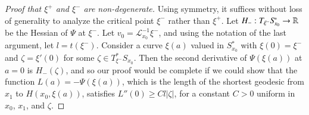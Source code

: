 


\begin{proof}[Proof that $\xi^+$ and $\xi^-$ are non-degenerate]
    Using symmetry, it suffices without loss of generality to analyze the critical point $\xi^-$ rather than $\xi^+$. Let $H_-: T_{\xi^-} S\!_{x_0}^* \to \operatorname{\mathbb{R}}$ be the Hessian of $\Psi$ at $\xi^-$. Let $v_0 = \mathcal{L}_{x_0}^{-1} \xi^-$, and using the notation of the last argument, let $l = t(\xi^-)$. Consider a curve $\xi(a)$ valued in $S\!_{x_0}^*$ with $\xi(0) = \xi^-$ and $\zeta = \xi'(0)$ for some $\zeta \in T_{\xi^-}^* S\!_{x_0}$. Then the second derivative of $\Psi(\xi(a))$ at $a = 0$ is $H_-( \zeta )$, and so our proof would be complete if we could show that the function $L(a) = - \Psi( \xi(a) )$, which is the length of the shortest geodesic from $x_1$ to $H(x_0,\xi(a))$, satisfies $L''(0) \geq C l |\zeta|$, for a constant $C > 0$ uniform in $x_0$, $x_1$, and $\zeta$.


\end{proof}
